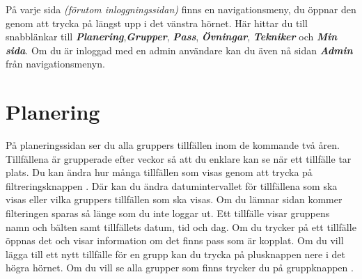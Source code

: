 \documentclass{article}
\newcommand{\term}[1]{\textcolor{secondary}{\textit{\textbf{#1}}}}
\newcommand*{\img}[1]{%
    \raisebox{-.3\baselineskip}{%
        \texttt{[image: \#1]}%
    }%
}
\begin{document}
{    På varje sida \textit{(förutom inloggningssidan)} finns en navigationsmeny, du öppnar den genom att trycka på \img{images/icons ref/menu.png} längst upp i det vänstra hörnet. Här hittar du till snabblänkar till \term{Planering},\term{Grupper}, \term{Pass}, \term{Övningar}, \term{Tekniker} och \term{Min sida}. Om du är inloggad med en admin användare kan du även nå sidan \term{Admin} från navigationsmenyn.

\newpage
\section{Planering}
    På planeringssidan ser du alla gruppers tillfällen inom de kommande två åren. Tillfällena är grupperade efter veckor så att du enklare kan se när ett tillfälle tar plats. Du kan ändra hur många tillfällen som visas genom att trycka på filtreringsknappen \img{images/icons ref/Filter.png}. Där kan du ändra datumintervallet för tillfällena som ska visas eller vilka gruppers tillfällen som ska visas. Om du lämnar sidan kommer filteringen sparas så länge som du inte loggar ut. Ett tillfälle visar gruppens namn och bälten samt tillfällets datum, tid och dag. Om du trycker på ett tillfälle öppnas det och visar information om det finns pass som är kopplat. Om du vill lägga till ett nytt tillfälle för en grupp kan du trycka på plusknappen \img{images/icons ref/RoundButton.png} nere i det högra hörnet. Om du vill se alla grupper som finns trycker du på gruppknappen \img{images/icons ref/GroupButton.png}. 

}
\end{document}
